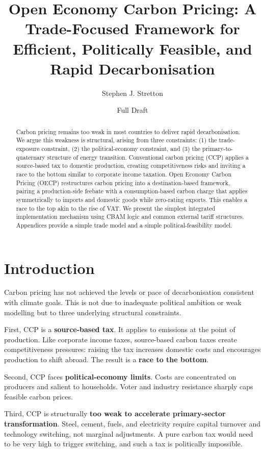 \documentclass[12pt]{article}
\title{Open Economy Carbon Pricing: A Trade-Focused Framework for Efficient, Politically Feasible, and Rapid Decarbonisation}
\author{Stephen J. Stretton}
\date{Full Draft}
\begin{document}
\maketitle

\begin{abstract}
Carbon pricing remains too weak in most countries to deliver rapid decarbonisation. We argue this weakness is structural, arising from three constraints: (1) the trade-exposure constraint, (2) the political-economy constraint, and (3) the primary-to-quaternary structure of energy transition. Conventional carbon pricing (CCP) applies a source-based tax to domestic production, creating competitiveness risks and inviting a race to the bottom similar to corporate income taxation. Open Economy Carbon Pricing (OECP) restructures carbon pricing into a destination-based framework, pairing a production-side feebate with a consumption-based carbon charge that applies symmetrically to imports and domestic goods while zero-rating exports. This enables a race to the top akin to the rise of VAT. We present the simplest integrated implementation mechanism using CBAM logic and common external tariff structures. Appendices provide a simple trade model and a simple political-feasibility model.
\end{abstract}


\tableofcontents
\section{Introduction}
Carbon pricing has not achieved the levels or pace of decarbonisation consistent with climate goals. This is not due to inadequate political ambition or weak modelling but to three underlying structural constraints.

First, CCP is a \textbf{source-based tax}. It applies to emissions at the point of production. Like corporate income taxes, source-based carbon taxes create competitiveness pressures: raising the tax increases domestic costs and encourages production to shift abroad. The result is a \textbf{race to the bottom}.

Second, CCP faces \textbf{political-economy limits}. Costs are concentrated on producers and salient to households. Voter and industry resistance sharply caps feasible carbon prices.

Third, CCP is structurally \textbf{too weak to accelerate primary-sector transformation}. Steel, cement, fuels, and electricity require capital turnover and technology switching, not marginal adjustments. A pure carbon tax would need to be very high to trigger switching, and such a tax is politically impossible.
\end{document}
